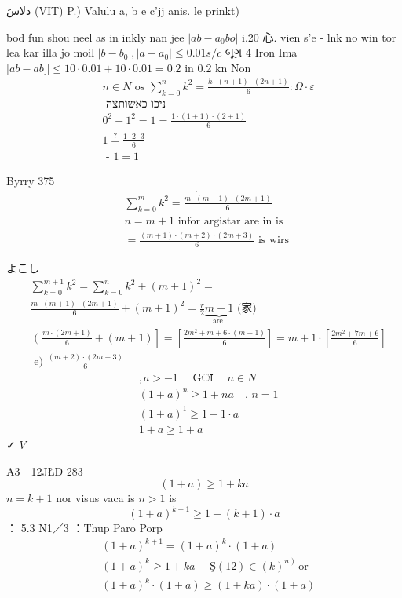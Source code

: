 \documentclass[12pt]{article}
\begin{document}
دلاسَ (VIT) P.) Valulu a, b e c'jj anis. le prinkt)

bod fun shou neel as in inkly nan jee \(\left|a b-a_{0} b o\right|\) i.20 心. vien s'e
- lnk no win tor lea kar illa jo moil \(\left|b-b_{0}\right|,\left|a-a_{0}\right| \leq 0.01 s / c\) બૂગ 4 Iron Ima \(\left|a b-a b_{.}\right| \leq 10 \cdot 0.01+10 \cdot 0.01=0.2\) in 0.2 kn Non
\[
\begin{aligned}
& n \in N \text { os } \sum_{k=0}^{n} k^{2}=\frac{h \cdot(n+1) \cdot(2 n+1)}{6}: \Omega \cdot \varepsilon \\
& \text { ניכו כאשותצה } \\
& 0^{2}+1^{2}=1=\frac{1 \cdot(1+1) \cdot(2+1)}{6} \\
& 1 \stackrel{?}{=} \frac{1 \cdot 2 \cdot 3}{6} \\
& \text { - } 1=1
\end{aligned}
\]

Byrry 375
\[
\begin{aligned}
& \dot{\sum_{k=0}^{m} k^{2}=\frac{m \cdot(m+1) \cdot(2 m+1)}{6}} \\
& n=m+1 \text { infor argistar are in is } \\
& =\frac{(m+1) \cdot(m+2) \cdot(2 m+3)}{6} \text { is wirs }
\end{aligned}
\]

よこし
\[
\begin{aligned}
& \sum_{k=0}^{m+1} k^{2}=\sum_{k=0}^{n} k^{2}+(m+1)^{2}= \\
& \frac{m \cdot(m+1) \cdot(2 m+1)}{6}+(m+1)^{2}=\frac{r}{2} \underbrace{m+1}_{\text {are }} \text { (家) } \\
& \text { ( } \left.\frac{m \cdot(2 m+1)}{6}+(m+1)\right]=\left[\frac{2 m^{2}+m+6 \cdot(m+1)}{6}\right]=m+1 \cdot\left[\frac{2 m^{2}+7 m+6}{6}\right] \\
& \text { e) } \frac{(m+2) \cdot(2 m+3)}{6}
\end{aligned}
\]
\[
\begin{aligned}
& , a>-1 \quad \text { Gा } \quad n \in N \\
& (1+a)^{n} \geq 1+n a \quad \text {. } n=1 \\
& (1+a)^{1} \geq 1+1 \cdot a \\
& 1+a \geq 1+a
\end{aligned}
\]
✓ \(V\)

A3－12JŁD 283
\[
(1+a) \geq 1+k a
\]
\(n=k+1\) nor visus vaca is \(n>1\) is
\[
(1+a)^{k+1} \geq 1+(k+1) \cdot a
\]
： 5.3 N1／3
：Thup Paro Porp
\[
\begin{aligned}
& (1+a)^{k+1}=(1+a)^{k} \cdot(1+a) \\
& (1+a)^{k} \geq 1+k a \quad \text { Ş}(12) \in(k)^{n .)} \text { or } \\
& (1+a)^{k} \cdot(1+a) \geq(1+k a) \cdot(1+a)
\end{aligned}
\]
\end{document}
